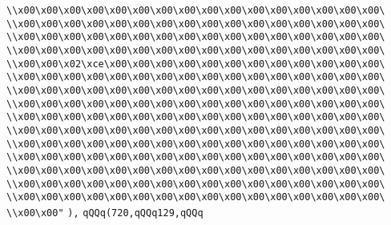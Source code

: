 \verb|\\x00\x00\x00\x00\x00\x00\x00\x00\x00\x00\x00\x00\x00\x00\x00\x00\|\newline
\verb|\\x00\x00\x00\x00\x00\x00\x00\x00\x00\x00\x00\x00\x00\x00\x00\x00\|\newline
\verb|\\x00\x00\x00\x00\x00\x00\x00\x00\x00\x00\x00\x00\x00\x00\x00\x00\|\newline
\verb|\\x00\x00\x00\x00\x00\x00\x00\x00\x00\x00\x00\x00\x00\x00\x00\x00\|\newline
\verb|\\x00\x00\x02\xce\x00\x00\x00\x00\x00\x00\x00\x00\x00\x00\x00\x00\|\newline
\verb|\\x00\x00\x00\x00\x00\x00\x00\x00\x00\x00\x00\x00\x00\x00\x00\x00\|\newline
\verb|\\x00\x00\x00\x00\x00\x00\x00\x00\x00\x00\x00\x00\x00\x00\x00\x00\|\newline
\verb|\\x00\x00\x00\x00\x00\x00\x00\x00\x00\x00\x00\x00\x00\x00\x00\x00\|\newline
\verb|\\x00\x00\x00\x00\x00\x00\x00\x00\x00\x00\x00\x00\x00\x00\x00\x00\|\newline
\verb|\\x00\x00\x00\x00\x00\x00\x00\x00\x00\x00\x00\x00\x00\x00\x00\x00\|\newline
\verb|\\x00\x00\x00\x00\x00\x00\x00\x00\x00\x00\x00\x00\x00\x00\x00\x00\|\newline
\verb|\\x00\x00\x00\x00\x00\x00\x00\x00\x00\x00\x00\x00\x00\x00\x00\x00\|\newline
\verb|\\x00\x00\x00\x00\x00\x00\x00\x00\x00\x00\x00\x00\x00\x00\x00\x00\|\newline
\verb|\\x00\x00\x00\x00\x00\x00\x00\x00\x00\x00\x00\x00\x00\x00\x00\x00\|\newline
\verb|\\x00\x00\x00\x00\x00\x00\x00\x00\x00\x00\x00\x00\x00\x00\x00\x00\|\newline
\verb|\\x00\x00"|\newline
\verb|),|\newline
\verb|qQQq(720,qQQq129,qQQq|\newline

